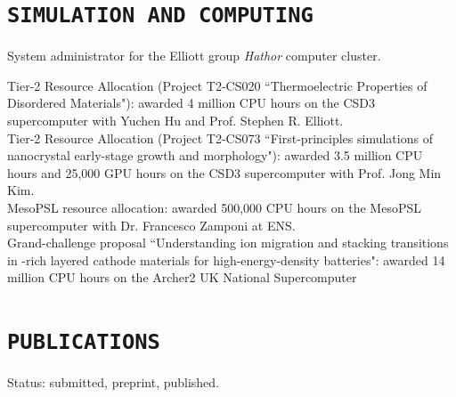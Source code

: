 \documentclass[11pt,a4paper,sans]{moderncv}        %
\begin{document}
\section{\texttt{SIMULATION AND COMPUTING}}

{\centering System administrator for the Elliott group \emph{Hathor} computer cluster.\\[0.4em]}

Tier-2 Resource Allocation (Project T2-CS020 ``Thermoelectric Properties of Disordered Materials"): awarded 4 million CPU hours on the CSD3 supercomputer with Yuchen Hu and Prof. Stephen R. Elliott. \\

Tier-2 Resource Allocation (Project T2-CS073 ``First-principles simulations of nanocrystal early-stage growth and morphology"): awarded 3.5 million CPU hours and 25,000 GPU hours on the CSD3 supercomputer with Prof. Jong Min Kim. \\

MesoPSL resource allocation: awarded 500,000 CPU hours on the MesoPSL supercomputer with Dr. Francesco Zamponi at ENS. \\

Grand-challenge proposal ``Understanding ion migration and stacking transitions in -rich layered cathode materials for high-energy-density batteries": awarded 14 million CPU hours on the Archer2 UK National Supercomputer


\section{\texttt{PUBLICATIONS}}
Status: %
{\color{color2} submitted},
{\color{color5} preprint},
{\color{color0} published}.
\vspace{0.1in}
\nocite{*}

{\color{color2}\printbibliography[heading=none,keyword=submitted]} 
\nocite{*}
\vspace{-0.2in}
\printbibliography[heading=none, notkeyword=submitted, notkeyword=preprint]
\end{document}
